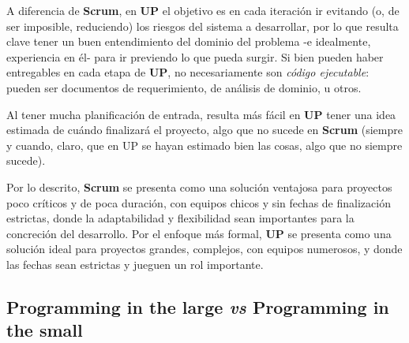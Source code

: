A diferencia de \textbf{Scrum}, en \textbf{UP} el objetivo es en cada iteración ir evitando (o, de ser imposible, reduciendo) los riesgos del sistema a desarrollar, por lo que resulta clave tener un buen entendimiento del dominio del problema -e idealmente, experiencia en él- para ir previendo lo que pueda surgir. Si bien pueden haber entregables en cada etapa de \textbf{UP}, no necesariamente son \textit{código ejecutable}: pueden ser documentos de requerimiento, de análisis de dominio, u otros.

Al tener mucha planificación de entrada, resulta más fácil en \textbf{UP} tener una idea estimada de cuándo finalizará el proyecto, algo que no sucede en \textbf{Scrum} (siempre y cuando, claro, que en UP se hayan estimado bien las cosas, algo que no siempre sucede).

Por lo descrito, \textbf{Scrum} se presenta como una solución ventajosa para proyectos poco críticos y de poca duración, con equipos chicos y sin fechas de finalización estrictas, donde la adaptabilidad y flexibilidad sean importantes para la concreción del desarrollo. Por el enfoque más formal, \textbf{UP} se presenta como una solución ideal para proyectos grandes, complejos, con equipos numerosos, y donde las fechas sean estrictas y jueguen un rol importante.

\newpage
\subsection{Programming in the large \textit{vs} Programming in the small}

